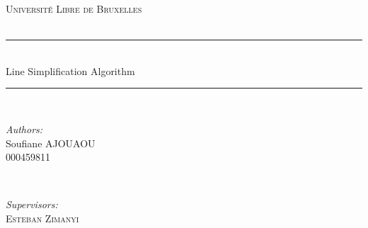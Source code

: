 \documentclass[twoside,12pt, a4paper]{report}
\begin{document}
\begin{titlepage}
\newcommand{\HRule}{\rule{\linewidth}{0.5mm}} %

\center %
 

\textsc{\LARGE Université Libre de Bruxelles}\\[1.5cm] %
\textsc{\Large }\\[0.5cm] %


\HRule \\[0.4cm]
{ \huge Line Simplification Algorithm \bfseries }\\[0.4cm] %
\HRule \\[1.2cm]
 

\begin{minipage}{0.4\textwidth}
\begin{flushleft} \large
\emph{Authors:}\\
Soufiane \textsc{AJOUAOU}\\  000459811\\


\end{flushleft}
\end{minipage}
~
\begin{minipage}{0.5\textwidth}
\begin{flushright} 
\emph{Supervisors:} \\
 \textsc{Esteban Zimanyi}\\


\end{flushright}
\end{minipage}\\[2cm]



\end{titlepage}
\end{document}
